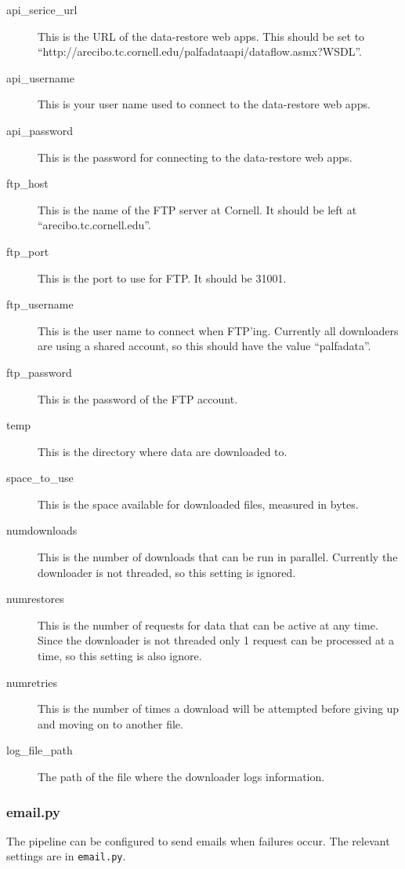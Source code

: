 \begin{description}
    \item[api\_serice\_url] This is the URL of the data-restore web apps. This should be set to ``http://arecibo.tc.cornell.edu/palfadataapi/dataflow.asmx?WSDL''.
    \item[api\_username] This is your user name used to connect to the data-restore web apps.
    \item[api\_password] This is the password for connecting to the data-restore web apps.
    \item[ftp\_host] This is the name of the FTP server at Cornell. It should be left at ``arecibo.tc.cornell.edu''.
    \item[ftp\_port] This is the port to use for FTP. It should be 31001.
    \item[ftp\_username] This is the user name to connect when FTP'ing. Currently all downloaders are using a shared account, so this should have the value ``palfadata''.
    \item[ftp\_password] This is the password of the FTP account.
    \item[temp] This is the directory where data are downloaded to.
    \item[space\_to\_use] This is the space available for downloaded files, measured in bytes.
    \item[numdownloads] This is the number of downloads that can be run in parallel. Currently the downloader is not threaded, so this setting is ignored.
    \item[numrestores] This is the number of requests for data that can be active at any time. Since the downloader is not threaded only 1 request can be processed at a time, so this setting is also ignore.
    \item[numretries] This is the number of times a download will be attempted before giving up and moving on to another file.
    \item[log\_file\_path] The path of the file where the downloader logs information.
\end{description}


\subsubsection{email.py}
The pipeline can be configured to send emails when failures occur. The relevant settings are in \texttt{email.py}.

